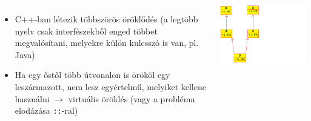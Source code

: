 \begin{frame}
    \begin{columns}[]
            \begin{itemize}
                \item C++-ban létezik többszörös öröklődés (a legtöbb nyelv csak interfészekből enged többet megvalósítani, melyekre külön kulcsszó is van, pl. Java)
                \item Ha egy őstől több útvonalon is örököl egy leszármazott, nem lesz egyértelmű, melyiket kellene használni $\to$ virtuális öröklés
                      (vagy a probléma elodázása \texttt{::}-ral)
            \end{itemize}
            \begin{center}
                \includegraphics[scale=0.8]{diamond1.eps}
            \end{center}
    \end{columns}
\end{frame}

\begin{frame}
    \begin{columns}[T]
            \begin{alertblock}{}
                \scriptsize
                
            \end{alertblock}
            \begin{alertblock}{}
                \scriptsize
                
            \end{alertblock}
    \end{columns}
\end{frame}

